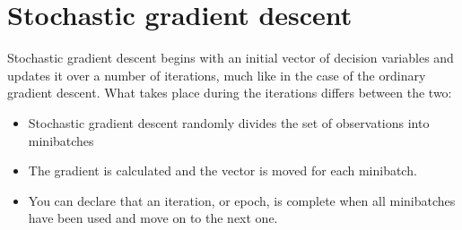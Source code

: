 \documentclass[
  a4paper]{article}
\providecommand{\tightlist}{%
  \setlength{\itemsep}{0pt}\setlength{\parskip}{0pt}}
\begin{document}
\hypertarget{stochastic-gradient-descent}{%
\section{Stochastic gradient descent}\label{stochastic-gradient-descent}}

Stochastic gradient descent begins with an initial vector of decision variables and updates it over a number of iterations, much like in the case of the ordinary gradient descent. What takes place during the iterations differs between the two:

\begin{itemize}
\tightlist
\item
  Stochastic gradient descent randomly divides the set of observations into minibatches
\item
  The gradient is calculated and the vector is moved for each minibatch.
\item
  You can declare that an iteration, or epoch, is complete when all minibatches have been used and move on to the next one.
\end{itemize}
\end{document}
